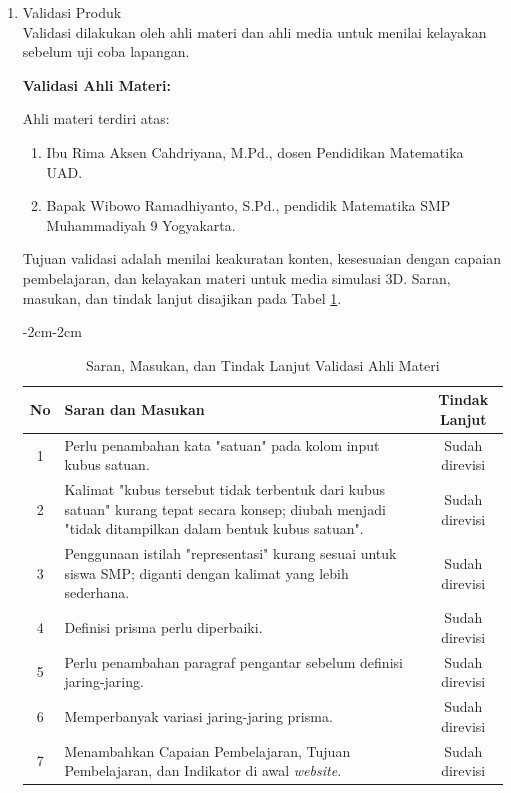 \begin{enumerate}[leftmargin=1cm, label=\arabic*.]
\begin{enumerate}[label=\arabic*)]
        \item Validasi Produk\\
        \hspace*{1cm}Validasi dilakukan oleh ahli materi dan ahli media untuk menilai kelayakan sebelum uji coba lapangan.
        
        \textbf{Validasi Ahli Materi:}
        
        \hspace*{1cm}Ahli materi terdiri atas:
        \begin{enumerate}[leftmargin=*, label=--]
            \item Ibu Rima Aksen Cahdriyana, M.Pd., dosen Pendidikan Matematika UAD.
            \item Bapak Wibowo Ramadhiyanto, S.Pd., pendidik Matematika SMP Muhammadiyah 9 Yogyakarta.
        \end{enumerate}
        
        \hspace*{1cm}Tujuan validasi adalah menilai keakuratan konten, kesesuaian dengan capaian pembelajaran, dan kelayakan materi untuk media simulasi 3D. Saran, masukan, dan tindak lanjut disajikan pada Tabel \ref{tabel:validasimateri}.
        \begin{table}[H]
\begin{adjustwidth}{-2cm}{-2cm}
    \centering
    \caption{Saran, Masukan, dan Tindak Lanjut Validasi Ahli Materi}
    \label{tabel:validasimateri}
    \begin{tabular}{|c|p{9cm}|c|}
        \hline
        \textbf{No} & \textbf{Saran dan Masukan} & \textbf{Tindak Lanjut} \\
        \hline
        1 & Perlu penambahan kata "satuan" pada kolom input kubus satuan. & Sudah direvisi \\
        \hline
        2 & Kalimat "kubus tersebut tidak terbentuk dari kubus satuan" kurang tepat secara konsep; diubah menjadi "tidak ditampilkan dalam bentuk kubus satuan". & Sudah direvisi \\
        \hline
        3 & Penggunaan istilah "representasi" kurang sesuai untuk siswa SMP; diganti dengan kalimat yang lebih sederhana. & Sudah direvisi \\
        \hline
        4 & Definisi prisma perlu diperbaiki. & Sudah direvisi \\
        \hline
        5 & Perlu penambahan paragraf pengantar sebelum definisi jaring-jaring. & Sudah direvisi \\
        \hline
        6 & Memperbanyak variasi jaring-jaring prisma. & Sudah direvisi \\
        \hline
        7 & Menambahkan Capaian Pembelajaran, Tujuan Pembelajaran, dan Indikator di awal \textit{website}. & Sudah direvisi \\
        \hline
    \end{tabular}
\end{adjustwidth}
\end{table}
\newpage
        

\end{enumerate}
\end{enumerate}

